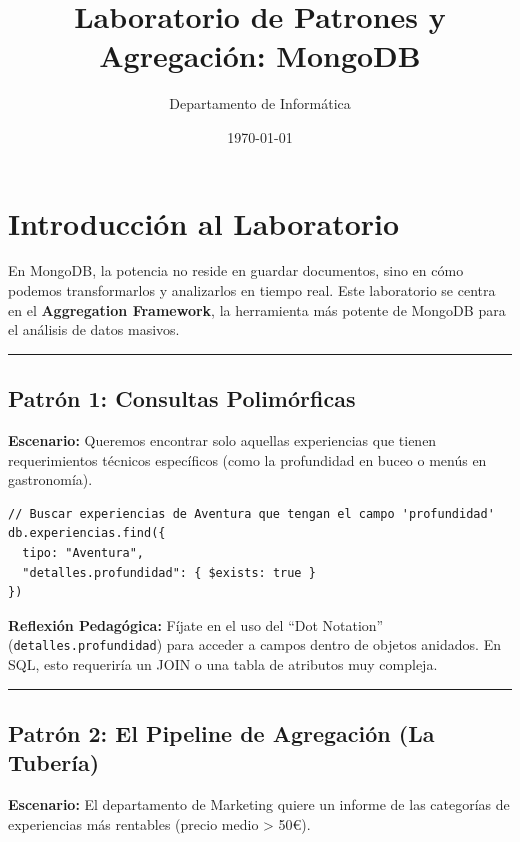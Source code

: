 \documentclass[12pt,a4paper]{article}
\title{\textbf{Laboratorio de Patrones y Agregación: MongoDB}}
\author{Departamento de Informática}
\date{\today}
\begin{document}
\maketitle

\section{Introducción al Laboratorio}\label{intro}
En MongoDB, la potencia no reside en guardar documentos, sino en cómo podemos transformarlos y analizarlos en tiempo real. Este laboratorio se centra en el \textbf{Aggregation Framework}, la herramienta más potente de MongoDB para el análisis de datos masivos.

\begin{center}\rule{0.5\linewidth}{0.5pt}\end{center}

\subsection{Patrón 1: Consultas Polimórficas}\label{polimorfismo}
\textbf{Escenario:} Queremos encontrar solo aquellas experiencias que tienen requerimientos técnicos específicos (como la profundidad en buceo o menús en gastronomía).

\begin{tcolorbox}[title=Filtrado por existencia de campos]
\begin{lstlisting}
// Buscar experiencias de Aventura que tengan el campo 'profundidad'
db.experiencias.find({
  tipo: "Aventura",
  "detalles.profundidad": { $exists: true }
})
\end{lstlisting}
\end{tcolorbox}

\textbf{Reflexión Pedagógica:} Fíjate en el uso del \enquote{Dot Notation} (\texttt{detalles.profundidad}) para acceder a campos dentro de objetos anidados. En SQL, esto requeriría un JOIN o una tabla de atributos muy compleja.

\begin{center}\rule{0.5\linewidth}{0.5pt}\end{center}

\subsection{Patrón 2: El Pipeline de Agregación (La Tubería)}\label{pipelines}
\textbf{Escenario:} El departamento de Marketing quiere un informe de las categorías de experiencias más rentables (precio medio > 50€).
\end{document}
